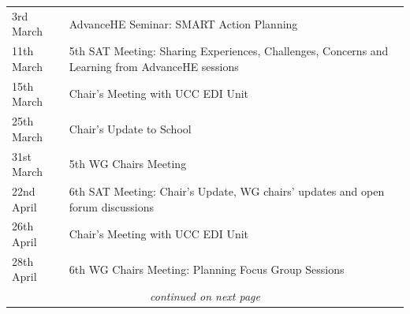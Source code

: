 \begin{table}[!t]
{\begin{minipage}{14.3cm}
\begin{tabular}{p{2cm} 
                p{12.3cm}}
3rd March &	AdvanceHE Seminar: SMART Action Planning\\
11th March &	5th SAT Meeting: Sharing Experiences, Challenges, Concerns and Learning from AdvanceHE sessions\\
15th March &	Chair’s Meeting with UCC EDI Unit\\
25th March &	Chair’s Update to School\\
31st March &	5th WG Chairs Meeting\\
22nd April &	6th SAT Meeting: Chair’s Update, WG chairs’ updates and open forum discussions\\
26th April &	Chair’s Meeting with UCC EDI Unit\\
28th April &	6th WG Chairs Meeting: Planning Focus Group Sessions\\[.1in]
\multicolumn{2}{c}{\textit{continued on next page}}\\
\end{tabular}
\end{minipage}
}
\end{table}


